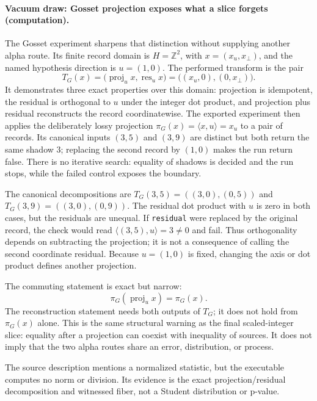 \paragraph{Vacuum draw: Gosset projection exposes what a slice forgets (computation).}
The Gosset experiment sharpens that distinction without supplying another alpha route.  Its finite record domain is
\(H=\mathbb Z^2\), with \(x=(x_u,x_\perp)\), and the named hypothesis direction is \(u=(1,0)\).  The performed
transform is the pair
\[
 T_G(x)=\bigl(\operatorname{proj}_u x,\operatorname{res}_u x\bigr)
       =\bigl((x_u,0),(0,x_\perp)\bigr).
\]
It demonstrates three exact properties over this domain: projection is idempotent, the residual is orthogonal to
\(u\) under the integer dot product, and projection plus residual reconstructs the record coordinatewise.  The
exported experiment then applies the deliberately lossy projection
\(\pi_G(x)=\langle x,u\rangle=x_u\) to a pair of records.  Its canonical inputs \((3,5)\) and \((3,9)\) are distinct
but both return the same shadow \(3\); replacing the second record by \((1,0)\) makes the run return false.  There is
no iterative search: equality of shadows is decided and the run stops, while the failed control exposes the boundary.

The canonical decompositions are \(T_G(3,5)=((3,0),(0,5))\) and
\(T_G(3,9)=((3,0),(0,9))\).  The residual dot product with \(u\) is zero in both cases, but the residuals are unequal.
If \texttt{residual} were replaced by the original record, the check would read
\(\langle(3,5),u\rangle=3\ne0\) and fail.  Thus orthogonality depends on subtracting the projection; it is not a
consequence of calling the second coordinate residual.  Because \(u=(1,0)\) is fixed, changing the axis or dot
product defines another projection.

The commuting statement is exact but narrow:
\[
                         \pi_G(\operatorname{proj}_u x)=\pi_G(x).
\]
The reconstruction statement needs both outputs of \(T_G\); it does not hold from \(\pi_G(x)\) alone.  This is the
same structural warning as the final scaled-integer slice: equality after a projection can coexist with inequality
of sources.  It does not imply that the two alpha routes share an error, distribution, or process.

The source description mentions a normalized statistic, but the executable computes no norm or division.  Its
evidence is the exact projection/residual decomposition and witnessed fiber, not a Student distribution or p-value.

